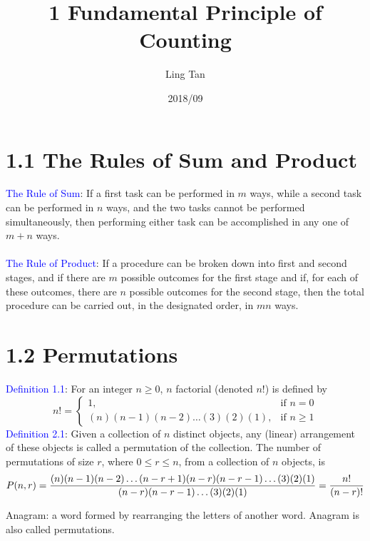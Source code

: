 \documentclass[a4paper]{article}
\title{1 Fundamental Principle of Counting}
\author{Ling Tan}
\date{2018/09}
\begin{document}
\maketitle
\section*{1.1 The Rules of Sum and Product}
\textcolor{blue}{The Rule of Sum}: If a first task can be performed in $m$ ways, while a second task can be performed in $n$ ways, and the two tasks cannot be performed simultaneously, then performing either task can be accomplished in any one of $m+n$ ways.\\
\\
\textcolor{blue}{The Rule of Product}: If a procedure can be broken down into first and second stages, and if there are $m$ possible outcomes for the first stage and if, for each of these outcomes, there are $n$ possible outcomes for the second stage, then the total procedure can be carried out, in the designated order, in $mn$ ways.

\section*{1.2 Permutations}
\textcolor{blue}{Definition 1.1}: For an integer $n\geq 0$, $n$ factorial (denoted $n!$) is defined by
$$
n! =
\begin{cases}
1,  & \text{if $n=0$} \\
(n)(n-1)(n-2)\dots(3)(2)(1), & \text{if $n\geqslant1$}
\end{cases}
$$
\textcolor{blue}{Definition 2.1}: Given a collection of $n$ distinct objects, any (linear) arrangement of these objects is called a permutation of the collection. The number of permutations of size $r$, where $0\leq r\leq n$, from a collection of $n$ objects, is
$$
P(n,r)={(n)(n-1)(n-2)\dots(n-r+1)(n-r)(n-r-1)\dots(3)(2)(1)\over(n-r)(n-r-1)\dots(3)(2)(1)}={n!\over(n-r)!}
$$
\begin{displayquote}
Anagram: a word formed by rearranging the letters of another word. Anagram is also called permutations.
\end{displayquote}
\end{document}
